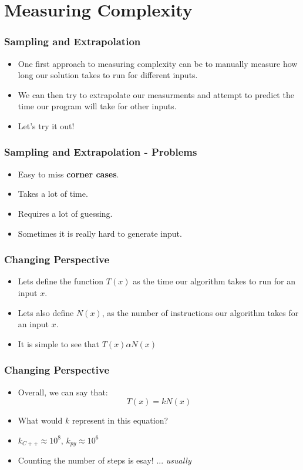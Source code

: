 \documentclass{beamer}
\begin{document}
\section{Measuring Complexity}

\begin{frame}
	\frametitle{Sampling and Extrapolation}

	\begin{itemize}
		\item One first approach to measuring complexity can be to manually measure how long our solution takes to run for different inputs.
		\item We can then try to extrapolate our measurments and attempt to predict the time our program will take for other inputs.
		\item Let's try it out!
	\end{itemize}
\end{frame}

\begin{frame}
	\frametitle{Sampling and Extrapolation - Problems}

	\begin{itemize}
		\item Easy to miss \textbf{corner cases}.
		\item Takes a lot of time.
		\item Requires a lot of guessing.
		\item Sometimes it is really hard to generate input.
	\end{itemize}
\end{frame}

\begin{frame}
	\frametitle{Changing Perspective}
	
	\begin{itemize}
		\item Lets define the function $T(x)$ as the time our algorithm takes to run for an input $x$.
		\item Lets also define $N(x)$, as the number of instructions our algorithm takes for an input $x$.
		\item It is simple to see that $T(x) \alpha N(x)$
	\end{itemize}
\end{frame}

\begin{frame}
	\frametitle{Changing Perspective}
	
	\begin{itemize}
		\item Overall, we can say that:
			$$T(x) = kN(x)$$
		\item What would $k$ represent in this equation?
		\item $k_{C++} \approx 10^8$, $k_{py} \approx 10^6$
		\item Counting the number of steps is esay! ... \textit{usually}
	\end{itemize}
\end{frame}
\end{document}
